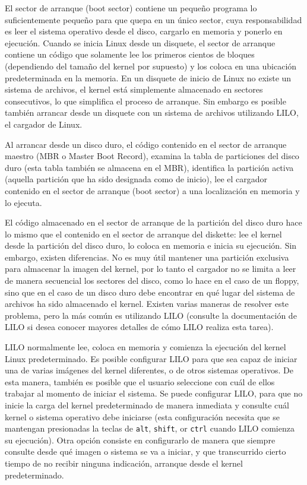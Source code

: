 \documentclass[12pt]{article}
\begin{document}
 El sector de arranque (boot sector) contiene un pequeño programa lo
suficientemente pequeño para que quepa en un único sector, cuya responsabilidad
es leer el sistema operativo desde el disco, cargarlo en memoria y ponerlo en
ejecución. Cuando se inicia Linux desde un disquete, el sector de arranque
contiene un código que solamente lee los primeros cientos de bloques
(dependiendo del tamaño del kernel por supuesto) y los coloca en una ubicación
predeterminada en la memoria. En un disquete de inicio de Linux no existe un
sistema de archivos, el kernel está simplemente almacenado en sectores
consecutivos, lo que simplifica el proceso de arranque. Sin embargo es posible
también arrancar desde un disquete con un sistema de archivos utilizando LILO,
el cargador de Linux.  


 Al arrancar desde un disco duro, el código contenido en el sector de
arranque maestro (MBR o Master Boot Record), examina la tabla de particiones del
disco duro (esta tabla también se almacena en el MBR), identifica la partición
activa (aquella partición que ha sido designada como de inicio), lee el cargador
contenido en el sector de arranque (boot sector) a una localización en memoria y
lo ejecuta.  

 El código almacenado en el sector de arranque de la partición del disco
duro hace lo mismo que el contenido en el sector de arranque del diskette: lee
el kernel desde la partición del disco duro, lo coloca en memoria e inicia su
ejecución. Sin embargo, existen diferencias. No es muy útil mantener una
partición exclusiva para almacenar la imagen del kernel, por lo tanto el
cargador no se limita a leer de manera secuencial los sectores del disco, como
lo hace en el caso de un floppy, sino que en el caso de un disco duro debe
encontrar en qué lugar del sistema de archivos ha sido almacenado el kernel.
Existen varias maneras de resolver este problema, pero la más común es
utilizando LILO (consulte la documentación de LILO si desea conocer mayores
detalles de cómo LILO realiza esta tarea).  

LILO normalmente lee, coloca en memoria y comienza la ejecución del kernel
Linux predeterminado. Es posible configurar LILO para que sea capaz de iniciar
una de varias imágenes del kernel diferentes, o de otros sistemas operativos. De
esta manera, también es posible que el usuario seleccione con cuál de ellos
trabajar al momento de iniciar el sistema.  Se puede configurar LILO, para que
no inicie la carga del kernel predeterminado de manera inmediata y consulte cuál
kernel o sistema operativo debe iniciarse (esta configuración necesita que se
mantengan presionadas la teclas de \texttt{alt}, \texttt{shift},
or \texttt{ctrl} cuando LILO comienza su ejecución). Otra opción
consiste en configurarlo de manera que siempre consulte desde qué imagen o
sistema se va a iniciar, y que transcurrido cierto tiempo de no recibir ninguna
indicación, arranque desde el kernel predeterminado.  
\end{document}
